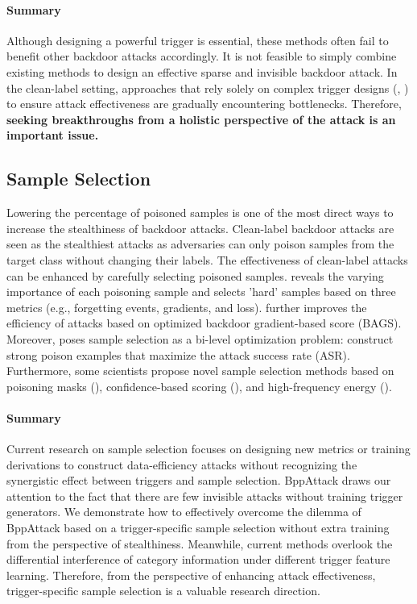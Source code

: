 \documentclass{article}
\begin{document}
\paragraph{Summary}
 Although designing a powerful trigger is essential, these methods often fail to benefit other backdoor attacks accordingly. It is not feasible to simply combine existing methods to design an effective sparse and invisible backdoor attack. In the clean-label setting, approaches that rely solely on complex trigger designs (\citet{wang2024invisible}, \citet{huynh2024combat}) to ensure attack effectiveness are gradually encountering bottlenecks. Therefore, \textbf{seeking breakthroughs from a holistic perspective of the attack is an important issue.}
\subsection{Sample Selection}
Lowering the percentage of poisoned samples is one of the most direct ways to increase the stealthiness of backdoor attacks. Clean-label backdoor attacks are seen as the stealthiest attacks as adversaries can only poison samples from the target class without changing their labels. The effectiveness of clean-label attacks can be enhanced by carefully selecting poisoned samples. \citet{gao2023not} reveals the varying importance of each poisoning sample and selects 'hard' samples based on three metrics (e.g., forgetting events, gradients, and loss). \citet{han2024backdooring} further improves the efficiency of attacks based on optimized backdoor gradient-based score (BAGS). Moreover, \citet{hayase2022few} poses sample selection as a bi-level optimization problem: construct strong poison examples that maximize the attack success rate (ASR). Furthermore, some scientists propose novel sample selection methods based on poisoning masks (\citet{zhu2023boosting}), confidence-based scoring (\citet{wu2023computation}), and high-frequency energy (\citet{xun2024minimalism}). 
\paragraph{Summary}
Current research on sample selection focuses on designing new metrics or training derivations to construct data-efficiency attacks without recognizing the synergistic effect between triggers and sample selection. BppAttack draws our attention to the fact that there are few invisible attacks without training trigger generators. We demonstrate how to effectively overcome the dilemma of BppAttack based on a trigger-specific sample selection without extra training from the perspective of stealthiness. Meanwhile, current methods overlook the differential interference of category information under different trigger feature learning. Therefore, from the perspective of enhancing attack effectiveness, trigger-specific sample selection is a valuable research direction.
\end{document}
